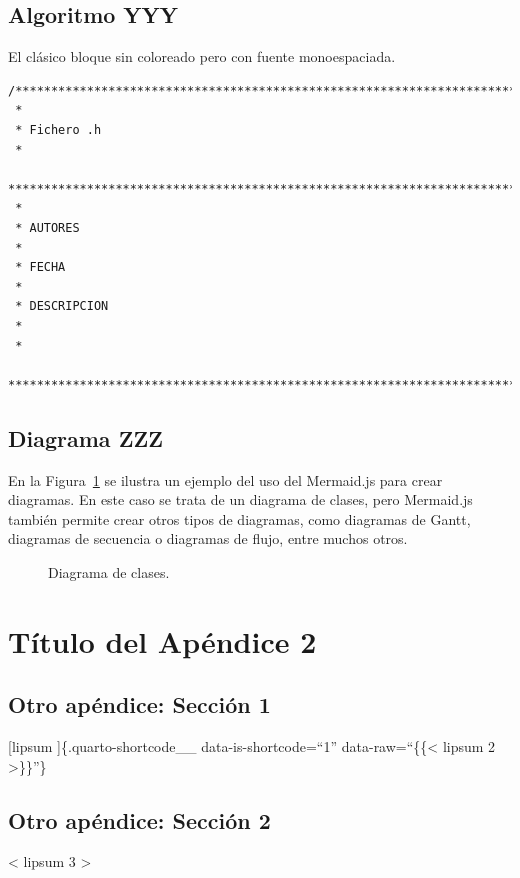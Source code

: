 \documentclass[
  letterpaper,
  DIV=11,
  numbers=noendperiod]{scrreprt}
\begin{document}
\section{Algoritmo YYY}\label{sec-algoritmo-yyy}

\noindent El clásico bloque sin coloreado pero con fuente monoespaciada.

\begin{verbatim}
/***********************************************************************************
 *
 * Fichero .h
 *
 ***********************************************************************************
 *
 * AUTORES
 *
 * FECHA
 *
 * DESCRIPCION
 *
 *
 ************************************************************************************/
\end{verbatim}

\section{Diagrama ZZZ}\label{sec-diagrama-zzz}

\noindent En la Figura~\ref{fig-diagrama} se ilustra un ejemplo del uso
del Mermaid.js para crear diagramas. En este caso se trata de un
diagrama de clases, pero Mermaid.js también permite crear otros tipos de
diagramas, como diagramas de Gantt, diagramas de secuencia o diagramas
de flujo, entre muchos otros.

\begin{figure}[htbp]


\caption{\label{fig-diagrama}Diagrama de clases.}

\end{figure}%

\chapter{Título del Apéndice 2}\label{ch-apuxe9ndice2}

\section{Otro apéndice: Sección 1}\label{otro-apuxe9ndice-secciuxf3n-1}

\noindent [lipsum {} {]}\{.quarto-shortcode\_\_ data-is-shortcode=``1''
data-raw=``\{\{\textless{} lipsum 2 \textgreater\}\}''\}

\section{Otro apéndice: Sección 2}\label{otro-apuxe9ndice-secciuxf3n-2}

{{< lipsum 3 >}}
\end{document}
